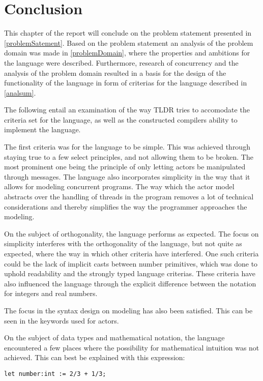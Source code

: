 \chapter{Conclusion}


This chapter of the report will conclude on the problem statement presented in \cref{problemSatement}. Based on the problem statement an analysis of the problem domain was made in \cref{problemDomain}, where the properties and ambitions for the language were described. Furthermore, research of concurrency and the analysis of the problem domain resulted in a basis for the design of the functionality of the language in form of criterias for the language described in \cref{analsum}.

The following entail an examination of the way TLDR tries to accomodate the criteria set for the language, as well as the constructed compilers ability to implement the language.

The first criteria was for the language to be simple. This was achieved through staying true to a few select principles, and not allowing them to be broken. The most prominent one being the principle of only letting actors be manipulated through messages. The language also incorporates simplicity in the way that it allows for modeling concurrent programs. The way which the actor model abstracts over the handling of threads in the program removes a lot of technical considerations and thereby simplifies the way the programmer approaches the modeling.

On the subject of orthogonality, the language performs as expected. The focus on simplicity interferes with the orthogonality of the language, but not quite as expected, where the way in which other criteria have interfered. One such criteria could be the lack of implicit casts between number primitives, which was done to uphold readability and the strongly typed language criterias. These criteria have also influenced the language through the explicit difference between the notation for integers and real numbers.

The focus in the syntax design on modeling has also been satisfied. This can be seen in the keywords used for actors.

On the subject of data types and mathematical notation, the language encountered a few places where the possibility for mathematical intuition was not achieved. This can best be explained with this expression:

\begin{lstlisting}
let number:int := 2/3 + 1/3;
\end{lstlisting}

